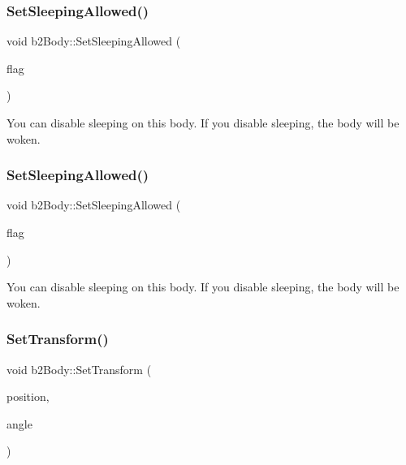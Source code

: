 \subsubsection{\texorpdfstring{Set\+Sleeping\+Allowed()}{SetSleepingAllowed()}\hspace{0.1cm}{\footnotesize\ttfamily [1/2]}}
{\footnotesize\ttfamily void b2\+Body\+::\+Set\+Sleeping\+Allowed (\begin{DoxyParamCaption}\item[{bool}]{flag }\end{DoxyParamCaption})\hspace{0.3cm}{\ttfamily [inline]}}

You can disable sleeping on this body. If you disable sleeping, the body will be woken. \mbox{\label{classb2Body_a229a6de228416203fecbf7a7544c33bb}} 
\subsubsection{\texorpdfstring{Set\+Sleeping\+Allowed()}{SetSleepingAllowed()}\hspace{0.1cm}{\footnotesize\ttfamily [2/2]}}
{\footnotesize\ttfamily void b2\+Body\+::\+Set\+Sleeping\+Allowed (\begin{DoxyParamCaption}\item[{bool}]{flag }\end{DoxyParamCaption})}

You can disable sleeping on this body. If you disable sleeping, the body will be woken. \mbox{\label{classb2Body_a4686f32bbce5723761e9719c706eca11}} 
\subsubsection{\texorpdfstring{Set\+Transform()}{SetTransform()}\hspace{0.1cm}{\footnotesize\ttfamily [1/2]}}
{\footnotesize\ttfamily void b2\+Body\+::\+Set\+Transform (\begin{DoxyParamCaption}\item[{const \hyperlink{structb2Vec2}{b2\+Vec2} \&}]{position,  }\item[{float32}]{angle }\end{DoxyParamCaption})}


